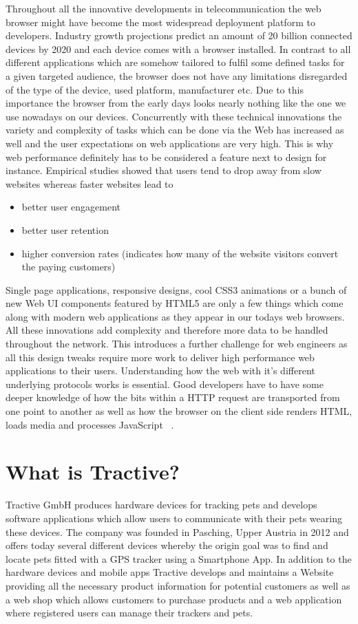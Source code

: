 Throughout all the innovative developments in telecommunication the web browser might have become the most widespread deployment platform to developers. Industry growth projections  \cite{Grigorik_2013} predict an amount of 20 billion connected devices by 2020 and each device comes with a browser installed. In contrast to all different applications which are somehow tailored to fulfil some defined tasks for a given targeted audience, the browser does not have any limitations disregarded of the type of the device, used platform, manufacturer etc. Due to this importance the browser from the early days looks nearly nothing like the one we use nowadays on our devices. Concurrently with these technical innovations the variety and complexity of tasks which can be done via the Web has increased as well and the user expectations on web applications are very high. This is why web performance definitely has to be considered a feature next to design for instance. Empirical studies showed that users tend to drop away from slow websites whereas faster websites lead to
	\begin{itemize}
		\item better user engagement
		\item better user retention
		\item higher conversion rates (indicates how many of the website visitors convert the paying customers)
	\end{itemize}
Single page applications, responsive designs, cool CSS3 animations or a bunch of new Web UI components featured by HTML5 are only a few things which come along with modern web applications as they appear in our todays web browsers. All these innovations add complexity and therefore more data to be handled throughout the network. This introduces a further challenge for web engineers as all this design tweaks require more work to deliver high performance web applications to their users.    
Understanding how the web with it's different underlying protocols works is essential. Good developers have to have some deeper knowledge of how the bits within a HTTP request are transported from one point to another as well as how the browser on the client side renders HTML, loads media and processes JavaScript ~\cite{Grigorik_2013}.


\section{What is Tractive?}

Tractive GmbH produces hardware devices for tracking pets and develops software applications which allow users to communicate with their pets wearing these devices. The company was founded in Pasching, Upper Austria in 2012 and offers today several different devices whereby the origin goal was to find and locate pets fitted with a GPS tracker using a Smartphone App. In addition to the hardware devices and mobile apps Tractive develops and maintains a Website providing all the necessary product information for potential customers as well as a web shop which allows customers to purchase products and a web application where registered users can manage their trackers and pets. 

